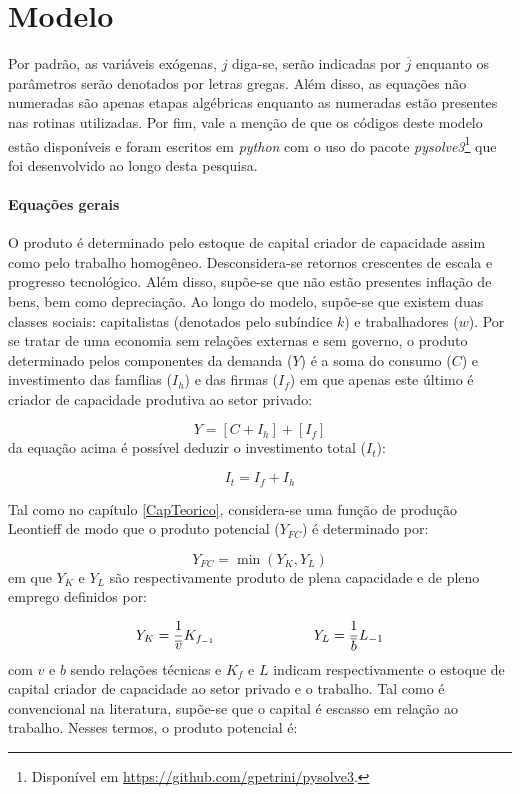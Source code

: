 \section{Modelo}
\label{SecModelo}

Por padrão, as variáveis exógenas, $j$ diga-se, serão indicadas por $\overline{j}$ enquanto os parâmetros serão denotados por letras gregas. Além disso, as equações não numeradas são apenas etapas algébricas enquanto as numeradas estão presentes nas rotinas utilizadas. Por fim, vale a menção de que os códigos deste modelo estão disponíveis e foram escritos em \textit{python} com o uso do pacote \textit{pysolve3}\footnote{
	Disponível em \url{https://github.com/gpetrini/pysolve3}.
} que foi desenvolvido ao longo desta pesquisa.

\paragraph*{Equações gerais}

O produto é determinado pelo estoque de capital criador de capacidade assim como pelo trabalho homogêneo. Desconsidera-se retornos crescentes de escala e progresso tecnológico.
Além disso, supõe-se que não estão presentes inflação de bens, bem como depreciação.  
Ao longo do modelo, supõe-se que existem duas classes sociais: capitalistas (denotados pelo subíndice $k$) e trabalhadores ($w$).
Por se tratar de uma economia sem relações externas e sem governo, o produto determinado pelos componentes da demanda ($Y$) é a soma do consumo ($C$) e investimento das famílias ($I_h$) e das firmas ($I_f$) em que apenas este último é criador de capacidade produtiva ao setor privado:

\begin{equation}
\label{_Y}
    Y = [C + I_h] + [I_f]
\end{equation}
da equação acima é possível deduzir o investimento total ($I_t$):

\begin{equation}
\label{_It}
    I_t = I_f + I_h
\end{equation}

Tal como no capítulo \ref{CapTeorico}, considera-se uma função de produção Leontieff de modo que o produto potencial ($Y_{FC}$) é determinado por:

$$
Y_{FC} = \min (Y_K, Y_L)
$$
em que $Y_K$ e $Y_L$ são respectivamente produto de plena capacidade e de pleno emprego definidos por:

$$
Y_K = \frac{1}{\overline v}K_{f_{-1}} \hspace{2.5cm} Y_L = \frac{1}{\overline b}L_{-1}
$$
com $v$ e $b$ sendo relações técnicas e $K_f$ e $L$ indicam respectivamente o estoque de capital criador de capacidade ao setor privado e  o trabalho. Tal como é convencional na literatura, supõe-se que o capital é escasso em relação ao trabalho. Nesses termos, o produto potencial é:

